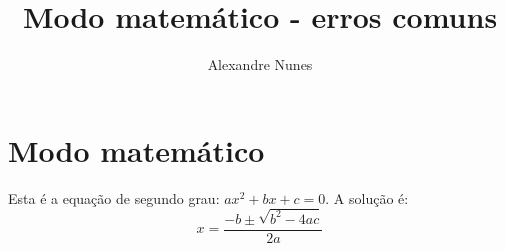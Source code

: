 \documentclass{article}
\begin{document}
	
	\title{\textbf{{\Huge Modo matemático - erros comuns}}} %
	\author{Alexandre Nunes} %
	\date{} %
	\maketitle %
	\thispagestyle{empty} %
	\newpage
	
	\setcounter{page}{1} %
	\tableofcontents %
	\newpage
	
	\listoffigures %
	\newpage
	
	\listoftables %
	\newpage

	\setcounter{page}{1} %
	
	\section{Modo matemático}

    Esta é a equação de segundo grau: $ ax^2 +bx +c=0 $. A solução é:
    \begin{equation*}
    	x = \frac{-b \pm \sqrt{b^2 -4ac}}{2a}
    \end{equation*}   

	
\end{document}
